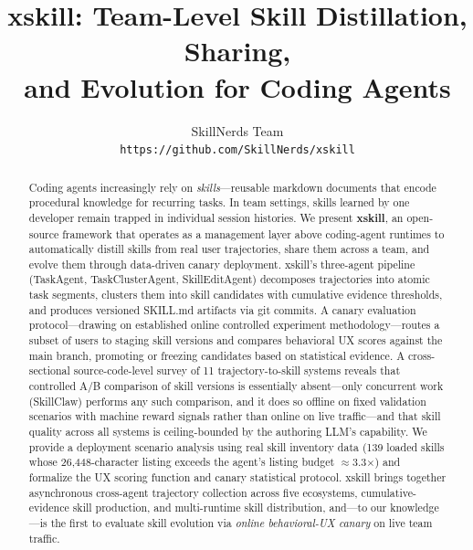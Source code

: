 \documentclass{article}
\title{xskill: Team-Level Skill Distillation, Sharing,\\ and Evolution for Coding Agents}
\author{
  SkillNerds Team \\
  \texttt{https://github.com/SkillNerds/xskill}
}
\begin{document}
\maketitle

\begin{abstract}
Coding agents increasingly rely on \emph{skills}---reusable markdown documents that encode procedural knowledge for recurring tasks. In team settings, skills learned by one developer remain trapped in individual session histories. We present \textbf{xskill}, an open-source framework that operates as a management layer above coding-agent runtimes to automatically distill skills from real user trajectories, share them across a team, and evolve them through data-driven canary deployment. xskill's three-agent pipeline (TaskAgent, TaskClusterAgent, SkillEditAgent) decomposes trajectories into atomic task segments, clusters them into skill candidates with cumulative evidence thresholds, and produces versioned SKILL.md artifacts via git commits. A canary evaluation protocol---drawing on established online controlled experiment methodology---routes a subset of users to staging skill versions and compares behavioral UX scores against the main branch, promoting or freezing candidates based on statistical evidence. A cross-sectional source-code-level survey of 11 trajectory-to-skill systems reveals that controlled A/B comparison of skill versions is essentially absent---only concurrent work (SkillClaw) performs any such comparison, and it does so offline on fixed validation scenarios with machine reward signals rather than online on live traffic---and that skill quality across all systems is ceiling-bounded by the authoring LLM's capability. We provide a deployment scenario analysis using real skill inventory data (139 loaded skills whose 26{,}448-character listing exceeds the agent's listing budget $\approx$3.3$\times$) and formalize the UX scoring function and canary statistical protocol. xskill brings together asynchronous cross-agent trajectory collection across five ecosystems, cumulative-evidence skill production, and multi-runtime skill distribution, and---to our knowledge---is the first to evaluate skill evolution via \emph{online behavioral-UX canary} on live team traffic.
\end{abstract}
\end{document}
